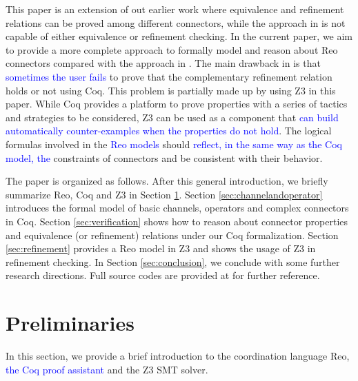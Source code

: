 \documentclass[preprint,3p]{elsarticle}
\newcommand{\liyi}[1]{\textcolor{blue}{#1}}
\newcommand{\xy}[1]{{#1}}
\begin{document}
\xy{
  This paper is an extension of out earlier work \cite{ZHL+17} where equivalence and refinement relations can be proved among different connectors, while the approach in \cite{LS15} is not capable of either equivalence or refinement checking.
  In the current paper, we aim to provide a more complete approach to formally model and reason about Reo connectors compared with the approach in \cite{ZHL+17}. The main drawback in \cite{ZHL+17} is that \liyi{sometimes the user fails} to prove that the complementary refinement relation holds or not using Coq. This problem is partially made up by using Z3 \cite{MouraB08} in this paper. While Coq provides a platform to prove properties with a series of tactics and strategies to be considered, Z3 can be used as a component that \liyi{can build automatically counter-examples when the properties do not hold}. The logical formulas involved in the \liyi{Reo models} should \liyi{reflect, in the same way as the Coq model, the} constraints of connectors and be consistent with their behavior.
}

The paper is organized as follows. After this general introduction, we briefly summarize Reo, Coq and Z3
in Section \ref{sec:pre}. Section \ref{sec:channelandoperator} introduces the
formal model of basic channels, operators and complex connectors in Coq. Section
\ref{sec:verification} shows how to reason about connector properties and equivalence (or
refinement) relations under our Coq formalization. Section \ref{sec:refinement} provides a Reo model in Z3 and shows the usage of Z3 in refinement checking.
In Section \ref{sec:conclusion}, we conclude with some further research directions. Full source codes \xy{are provided} at \cite{reo2coq2Z3} for further reference.

\section{Preliminaries}\label{sec:pre}

In this section, we provide a brief introduction to the coordination language Reo, \liyi{the Coq proof assistant} and the Z3 SMT solver.
\end{document}
